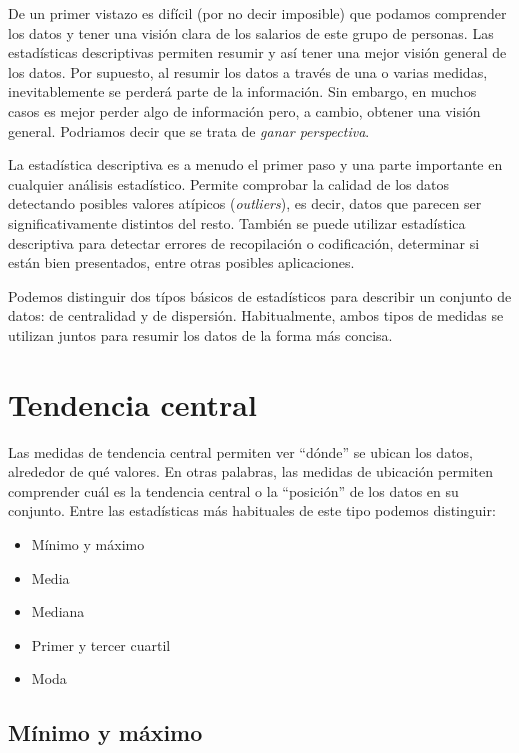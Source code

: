 \documentclass[
]{book}
\providecommand{\tightlist}{%
  \setlength{\itemsep}{0pt}\setlength{\parskip}{0pt}}
\begin{document}
De un primer vistazo es difícil (por no decir imposible) que podamos comprender los datos y tener una visión clara de los salarios de este grupo de personas. Las estadísticas descriptivas permiten resumir y así tener una mejor visión general de los datos. Por supuesto, al resumir los datos a través de una o varias medidas, inevitablemente se perderá parte de la información. Sin embargo, en muchos casos es mejor perder algo de información pero, a cambio, obtener una visión general. Podriamos decir que se trata de \emph{ganar perspectiva}.

La estadística descriptiva es a menudo el primer paso y una parte importante en cualquier análisis estadístico. Permite comprobar la calidad de los datos detectando posibles valores atípicos (\emph{outliers}), es decir, datos que parecen ser significativamente distintos del resto. También se puede utilizar estadística descriptiva para detectar errores de recopilación o codificación, determinar si están bien presentados, entre otras posibles aplicaciones.

Podemos distinguir dos típos básicos de estadísticos para describir un conjunto de datos: de centralidad y de dispersión. Habitualmente, ambos tipos de medidas se utilizan juntos para resumir los datos de la forma más concisa.

\hypertarget{tendencia-central}{%
\section{Tendencia central}\label{tendencia-central}}

Las medidas de tendencia central permiten ver ``dónde'' se ubican los datos, alrededor de qué valores. En otras palabras, las medidas de ubicación permiten comprender cuál es la tendencia central o la ``posición'' de los datos en su conjunto. Entre las estadísticas más habituales de este tipo podemos distinguir:

\begin{itemize}
\tightlist
\item
  Mínimo y máximo
\item
  Media
\item
  Mediana
\item
  Primer y tercer cuartil
\item
  Moda
\end{itemize}

\hypertarget{muxednimo-y-muxe1ximo}{%
\subsection{Mínimo y máximo}\label{muxednimo-y-muxe1ximo}}
\end{document}
